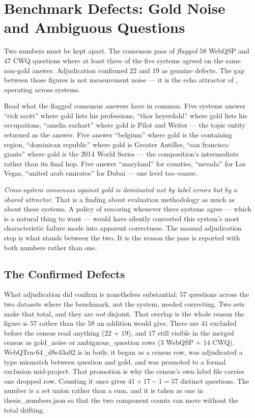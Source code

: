 \section{Benchmark Defects: Gold Noise and Ambiguous
Questions}\label{sec:benchmark-defects}

Two numbers must be kept apart. The consensus pass of
 \emph{flagged}
$58$ WebQSP and $47$ CWQ questions where at least three of the five systems
agreed on the same non-gold answer. Adjudication confirmed $22$ and $19$ as
genuine defects. The gap between those figures is not measurement noise --- it
is the echo attractor of , operating across systems.

Read what the flagged consensus answers have in common. Five systems answer
``rick scott'' where gold lists his professions, ``thor heyerdahl'' where gold
lists his occupations, ``amelia earhart'' where gold is Pilot and Writer --- the
topic entity returned as the answer. Five answer ``belgium'' where gold is the
containing region, ``dominican republic'' where gold is Greater Antilles, ``san
francisco giants'' where gold is the 2014 World Series --- the composition's
intermediate rather than its final hop. Five answer ``maryland'' for counties,
``nevada'' for Las Vegas, ``united arab emirates'' for Dubai --- one level too
coarse.

\emph{Cross-system consensus against gold is dominated not by label errors but
by a shared attractor}. That is a finding about evaluation methodology as
much as about these systems. A policy of rescoring whenever three systems agree
--- which is a natural thing to want --- would have silently converted this
system's most characteristic failure mode into apparent correctness. The manual
adjudication step is what stands between the two. It is the reason the pass
is reported with both numbers rather than one.

\subsection{The Confirmed Defects}

What adjudication did confirm is nonetheless substantial: $57$ questions across
the two datasets where the benchmark, not the system, needed correcting. Two
sets make that total, and they are \emph{not} disjoint. That overlap is the
whole reason the figure is $57$ rather than the $58$ an addition would give.
There are $41$ excluded before the census read anything ($22$ + $19$), and $17$
still visible in the merged census as \textsf{gold\_noise} or
\textsf{ambiguous\_question} rows ($3$ WebQSP + $14$ CWQ).
\textsf{WebQTrn-64\_d8e43a02} is in both: it began as a census row, was
adjudicated a type mismatch between question and gold, and was promoted to a
formal exclusion mid-project. That promotion is why the census's own label
file carries one dropped row. Counting it once gives $41 + 17 - 1 = 57$ distinct
questions. The number is a set union rather than a sum, and it is taken as one
in \textsf{thesis\_numbers.json} so that the two component counts can move
without the total drifting.

